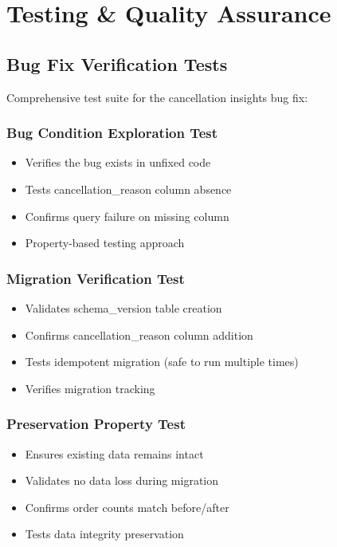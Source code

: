 \documentclass[12pt,a4paper]{article}
\begin{document}
\newpage

\section{Testing \& Quality Assurance}


\subsection{Bug Fix Verification Tests}

Comprehensive test suite for the cancellation insights bug fix:

\subsubsection{Bug Condition Exploration Test}
\begin{itemize}[leftmargin=*]
    \item Verifies the bug exists in unfixed code
    \item Tests cancellation\_reason column absence
    \item Confirms query failure on missing column
    \item Property-based testing approach
\end{itemize}

\subsubsection{Migration Verification Test}
\begin{itemize}[leftmargin=*]
    \item Validates schema\_version table creation
    \item Confirms cancellation\_reason column addition
    \item Tests idempotent migration (safe to run multiple times)
    \item Verifies migration tracking
\end{itemize}

\subsubsection{Preservation Property Test}
\begin{itemize}[leftmargin=*]
    \item Ensures existing data remains intact
    \item Validates no data loss during migration
    \item Confirms order counts match before/after
    \item Tests data integrity preservation
\end{itemize}
\end{document}

